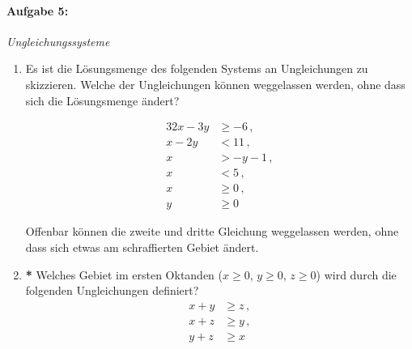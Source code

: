 \paragraph{Aufgabe 5: } \emph{Ungleichungssysteme}
\begin{enumerate}[label=(\alph*), labelindent=1em,labelsep=0.5cm]
\item Es ist die Lösungsmenge des folgenden Systems an Ungleichungen zu skizzieren. Welche der Ungleichungen können weggelassen werden, ohne dass sich die Lösungsmenge ändert?

\begin{minipage}{0.2\textwidth}
    \begin{alignat*}{3}
        2x-3y&\geq -6\,,\\
        x-2y&< 11\,,\\
        x&>-y-1\,,\\
        x&<5\,,\\
        x&\geq 0\,,\\
        y&\geq 0
    \end{alignat*}
\end{minipage}
\begin{minipage}{0.8\textwidth}
    \centering
\end{minipage}
Offenbar können die zweite und dritte Gleichung weggelassen werden, ohne dass sich etwas am schraffierten Gebiet ändert. 

\item \textbf{*} Welches Gebiet im ersten Oktanden ($x\ge 0$, $y\ge 0$, $z\ge 0$) wird durch die folgenden Ungleichungen definiert?
\begin{align*}
    x+y&\ge z\,,\\
    x+z&\ge y\,,\\
    y+z&\ge x
\end{align*}


\end{enumerate}
